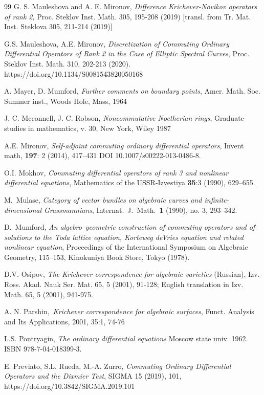 \documentclass[11pt]{article}
\theoremstyle{definition}
\theoremstyle{plain}
\numberwithin{equation}{section}
\begin{document}
\begin{thebibliography}{99}
 G. S. Mauleshova and A. E. Mironov, {\it Difference Krichever-Novikov operators of rank 2,} Proc. Steklov Inst. Math. 305, 195-208 (2019) [transl. from Tr. Mat. Inst. Steklova 305, 211-214 (2019)]

 G.S. Mauleshova, A.E. Mironov, {\it Discretization of Commuting Ordinary Differential Operators of Rank 2 in the Case of Elliptic Spectral Curves}, Proc. Steklov Inst. Math. 310, 202-213 (2020). https://doi.org/10.1134/S0081543820050168

 A. Mayer, D. Mumford, {\it Further comments on boundary points}, Amer. Math. Soc. Summer inst., Woods Hole, Mass, 1964  

 J. C. Mcconnell, J. C. Robson, {\em Noncommutative Noetherian rings}, Graduate studies in mathematics, v. 30, New York, Wiley 1987

 A.E. Mironov, {\it Self-adjoint commuting ordinary differential
operators}, Invent math, {\bf 197}: 2 (2014), 417--431
DOI 10.1007/s00222-013-0486-8.


 O.I. Mokhov, \textit{Commuting differential operators of rank 3 and nonlinear differential equations},  Mathematics of the USSR-Izvestiya {\bf 35}:3 (1990), 629--655.


 M.~Mulase,  \emph{Category of vector bundles on algebraic curves and infinite-dimensional Grassmannians}, Internat.~J.~Math.~\textbf{1} (1990), no. 3, 293--342.

 D.~Mumford,  \emph{An algebro--geometric construction of commuting operators and of solutions to the Toda lattice equation, Korteweg deVries equation and related nonlinear equation},  Proceedings of the International Symposium on Algebraic Geometry, 115--153, Kinokuniya Book Store, Tokyo (1978).

 D.V. Osipov,
{\em  The Krichever correspondence for algebraic varieties}
(Russian), Izv. Ross. Akad. Nauk Ser. Mat. 65, 5 (2001), 91-128;
English translation in Izv. Math. 65, 5 (2001), 941-975.

 A. N. Parshin,~{\em Krichever correspondence for algebraic surfaces}, Funct. Analysis and Its Applications, 2001, 35:1, 74-76


 L.S. Pontryagin, {\em The ordinary differential equations} Moscow state univ. 1962. ISBN 978-7-04-018399-3.

 E. Previato, S.L. Rueda, M.-A. Zurro, {\it Commuting Ordinary Differential Operators and the Dixmier Test},  SIGMA 15 (2019), 101, https://doi.org/10.3842/SIGMA.2019.101 


\end{thebibliography}
\end{document}
